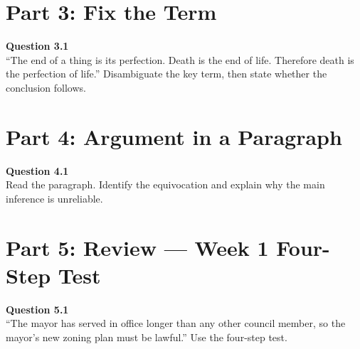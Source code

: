 \documentclass[12pt]{article}
\begin{document}

\newpage

\section*{Part 3: Fix the Term}

\textbf{Question 3.1}\\[-0.15em]
``The end of a thing is its perfection. Death is the end of life. Therefore death is the perfection of life.'' Disambiguate the key term, then state whether the conclusion follows.


\newpage

\section*{Part 4: Argument in a Paragraph}

\textbf{Question 4.1}\\[-0.15em]
Read the paragraph. Identify the equivocation and explain why the main inference is unreliable.

\vspace{0.2em}

\noindent{}


\newpage

\section*{Part 5: Review — Week 1 Four-Step Test}

\textbf{Question 5.1}\\[-0.15em]
``The mayor has served in office longer than any other council member, so the mayor's new zoning plan must be lawful.'' Use the four-step test.
\end{document}
